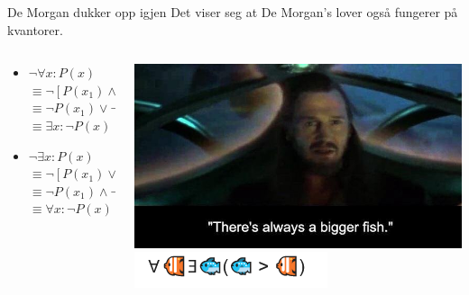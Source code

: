 \begin{frame}{De Morgan dukker opp igjen}
Det viser seg at De Morgan's lover også fungerer på kvantorer.\\
    \begin{columns}
    \begin{column}{0.48\textwidth}
    \begin{itemize}
        \item $\lnot \forall x : P(x)$ \\
        $\equiv \lnot [P(x_1) \land P(x_2) \land ... \land P(x_n)]$\\
        $\equiv \lnot P(x_1) \lor \lnot P(x_2) \lor ... \lor \lnot P(x_n)$\\ $\equiv \exists x : \lnot P(x)$
        \pause
        \item $\lnot \exists x : P(x)$\\
        $\equiv \lnot [P(x_1) \lor P(x_2) \lor ... \lor .. P(x_n)]$\\
        $\equiv \lnot P(x_1) \land \lnot P(x_2) \land ... \land \lnot P(x_n)$\\ 
        $\equiv \forall x : \lnot P(x)$
    \end{itemize}      
    \end{column}
    \pause
    \begin{column}{0.45\textwidth}
        \includegraphics[scale=0.3]{images/Always a bigger fish.jpeg}
        \pause
        \includegraphics[scale=1]{images/bigger fish.PNG}
    \end{column}
    \end{columns}
\end{frame}